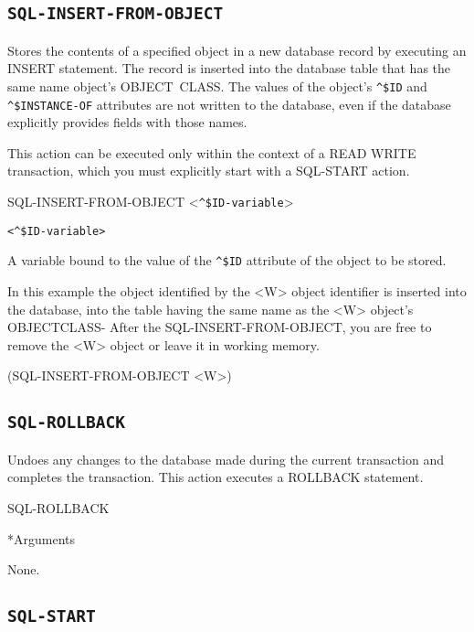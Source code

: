 {{\subsection{\tt{SQL-INSERT-FROM-OBJECT}}

Stores the contents of a specified object in a new database
record by executing an INSERT statement. The record is
inserted into the database table that has the same name
object's OBJECT~CLASS. The values of the object's \verb|^$ID| and
\verb|^$INSTANCE-OF| attributes are not written to the database,
even if the database explicitly provides fields with those
names.

This action can be executed only within the context of a READ
WRITE transaction, which you must explicitly start with a
SQL-START action.



\Format

SQL-INSERT-FROM-OBJECT <\verb|^$ID-variable|>

\Argument

\verb|<^$ID-variable>|

A variable bound to the value of the \verb|^$ID| attribute of the
object to be stored.



\Example

In this example the object identified by the <W> object
identifier is inserted into the database, into the table
having the same name as the <W> object's OBJECTCLASS- After
the SQL-INSERT-FROM-OBJECT, you are free to remove the <W>
object or leave it in working memory.



(SQL-INSERT-FROM-OBJECT <W>)

\subsection{\tt{SQL-ROLLBACK}}

Undoes any changes to the database made during the current
transaction and completes the transaction. This action
executes a ROLLBACK statement.



\Format

SQL-ROLLBACK



*Arguments

None.

\subsection{\tt{SQL-START}}

}}
